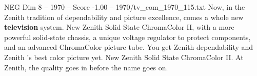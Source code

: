 \begin{textsample}{NEG Dim 8 – 1970 – Score -1.00 – 1970/tv\_com\_1970\_115.txt}  \label{ex:f8_neg_003}
Now, in the Zenith tradition of dependability and picture excellence, comes a whole new \textbf{television} system.
New Zenith Solid State ChromaColor II, with a more powerful solid-state chassis, a unique voltage regulator to protect components, and an advanced ChromaColor picture tube.
You get Zenith dependability and Zenith 's best color picture yet.
New Zenith Solid State ChromaColor II.
At Zenith, the quality goes in before the name goes on.

\end{textsample}
